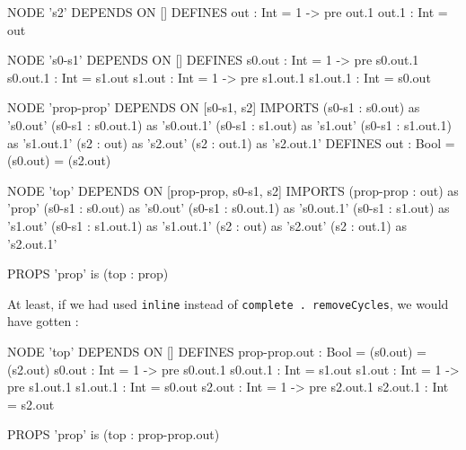 \begin{code}
NODE 's2' DEPENDS ON []
DEFINES
    out : Int =
        1 -> pre out.1
    out.1 : Int =
        out

NODE 's0-s1' DEPENDS ON []
DEFINES
    s0.out : Int =
        1 -> pre s0.out.1
    s0.out.1 : Int =
        s1.out
    s1.out : Int =
        1 -> pre s1.out.1
    s1.out.1 : Int =
        s0.out

NODE 'prop-prop' DEPENDS ON [s0-s1, s2]
IMPORTS
    (s0-s1 : s0.out) as 's0.out'
    (s0-s1 : s0.out.1) as 's0.out.1'
    (s0-s1 : s1.out) as 's1.out'
    (s0-s1 : s1.out.1) as 's1.out.1'
    (s2 : out) as 's2.out'
    (s2 : out.1) as 's2.out.1'
DEFINES
    out : Bool =
        (s0.out) = (s2.out)

NODE 'top' DEPENDS ON [prop-prop, s0-s1, s2]
IMPORTS
    (prop-prop : out) as 'prop'
    (s0-s1 : s0.out) as 's0.out'
    (s0-s1 : s0.out.1) as 's0.out.1'
    (s0-s1 : s1.out) as 's1.out'
    (s0-s1 : s1.out.1) as 's1.out.1'
    (s2 : out) as 's2.out'
    (s2 : out.1) as 's2.out.1'

PROPS
'prop' is (top : prop)
\end{code}
At least, if we had used \texttt{inline} instead of \texttt{complete . removeCycles}, we would have gotten :
\begin{code}
NODE 'top' DEPENDS ON []
DEFINES
    prop-prop.out : Bool =
        (s0.out) = (s2.out)
    s0.out : Int =
        1 -> pre s0.out.1
    s0.out.1 : Int =
        s1.out
    s1.out : Int =
        1 -> pre s1.out.1
    s1.out.1 : Int =
        s0.out
    s2.out : Int =
        1 -> pre s2.out.1
    s2.out.1 : Int =
        s2.out

PROPS
'prop' is (top : prop-prop.out)
\end{code}

